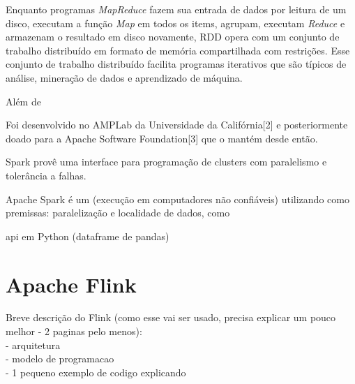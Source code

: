 
Enquanto programas \emph{MapReduce} fazem sua entrada de dados por leitura de um
disco, executam a função \emph{Map} em todos os items, agrupam, executam
\emph{Reduce} e armazenam o resultado em disco novamente, RDD opera com um
conjunto de trabalho distribuído em formato de memória compartilhada com
restrições. Esse conjunto de trabalho distribuído facilita programas iterativos
que são típicos de análise, mineração de dados e aprendizado de máquina.

Além de 

Foi desenvolvido no AMPLab da Universidade da Califórnia[2] e posteriormente
doado para a Apache Software Foundation[3] que o mantém desde então.

Spark provê uma interface para programação de clusters com paralelismo e
tolerância a falhas.

Apache Spark \cite{Zaharia} é um 
(execução em computadores não confiáveis) utilizando como premissas: paralelização
e localidade de dados, como 


api em Python (dataframe de pandas)


\section{Apache Flink}

Breve descrição do Flink (como esse vai ser usado, precisa explicar um pouco melhor - 2 paginas pelo menos):\\
- arquitetura\\
- modelo de programacao\\
- 1 pequeno exemplo de codigo explicando

\cite{Lopez2018}




